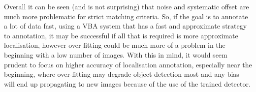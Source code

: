 Overall it can be seen (and is not surprising) that noise and systematic offset are much more problematic for strict matching criteria. So, if the goal is to annotate a lot of data fast, using a \gls{VBA} system that has a fast and approximate strategy to annotation, it may be successful if all that is required is more approximate localisation, however over-fitting could be much more of a problem in the beginning with a low number of images. With this in mind, it would seem prudent to focus on higher accuracy of localisation annotation, especially near the beginning, where over-fitting may degrade object detection most and any bias will end up propagating to new images because of the use of the trained detector.








